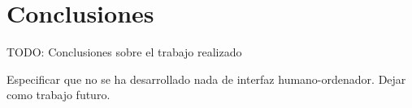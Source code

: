 \chapter{Conclusiones\label{sec:conclusiones}}

TODO: Conclusiones sobre el trabajo realizado

Especificar que no se ha desarrollado nada de interfaz humano-ordenador. Dejar como trabajo futuro.